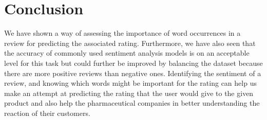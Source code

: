 \documentclass{article}
\begin{document}
\section{Conclusion}

We have shown a way of assessing the importance of word occurrences in a review for predicting the associated rating. Furthermore, we have also seen that the accuracy of commonly used sentiment analysis models is on an acceptable level for this task but could further be improved by balancing the dataset because there are more positive reviews than negative ones.
Identifying the sentiment of a review, and knowing which words might be important for
the rating can help us make an attempt at predicting the rating that the user would give to the given product and also help the pharmaceutical companies in better understanding the reaction of their
customers.
\printbibliography
\end{document}
